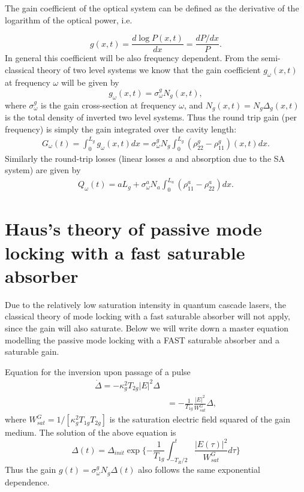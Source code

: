 \documentclass[preprint,secnumarabic,amssymb, nobibnotes, aip, prd]{revtex4-1}
\begin{document}
The gain coefficient of the optical system can be defined as the derivative of the logarithm of the optical power, i.e. 

\begin{equation}
g(x,t) = \frac{d \log P(x,t)}{dx} = \frac{dP /dx}{P}.
\end{equation}
In general this coefficient will be also frequency dependent. From the semi-classical theory of two level systems we know that the gain coefficient $g_\omega(x,t)$ at frequency $\omega$ will be given by 
\begin{equation}
g_\omega(x,t) = \sigma_{\omega}^{g}N_g(x,t), 
\end{equation} 
where $\sigma_\omega^g$ is the gain cross-section at frequency $\omega$, and $N_g(x,t) = N_g\Delta_g(x,t)$ is the total density of inverted two level systems. 
Thus the round trip gain (per frequency) is simply the gain integrated over the cavity length:
\begin{align}
\label{eq:rount_trip_gain}
G_\omega(t) = \int_{0}^{L_g} g_\omega(x,t)dx =  \sigma_{\omega}^{g} N_g \int_{0}^{L_g}(\rho_{22}^g-\rho_{11}^g)(x,t) dx.
\end{align}
Similarly the round-trip losses (linear losses $a$ and absorption due to the SA system) are given by
\begin{align}
\label{eq:rount_trip_loss}
Q_\omega(t) = aL_g +  \sigma_{\omega}^{a} N_a \int_{0}^{L_a}(\rho_{11}^a-\rho_{22}^a)dx.
\end{align}



\section{Haus's theory of passive mode locking with a fast saturable absorber}
\label{sec:haustheory}

Due to the relatively low saturation intensity in quantum cascade lasers, the classical theory of mode locking with a fast saturable absorber will not apply, since the gain will also saturate. Below we will write down a master equation modelling the passive mode locking  with a FAST saturable absorber and a saturable gain. 

Equation for the inversion upon passage of a pulse 
\begin{align}
\dot \Delta = - \kappa_g^2T_{2g} |E|^2 \Delta  \nonumber \\
&= - \frac{1}{T_{1g}}\frac{|E|^2}{W_{sat}^G}\Delta, 
\end{align}
where $W_{sat}^G = 1/[\kappa_g^2T_{1g}T_{2g}]$ is the saturation electric field squared of the gain medium. The solution of the above equation is 
\begin{equation}
\Delta(t) = \Delta_{init}\exp\{-\frac{1}{T_{1g}} \int_{-T_R/2}^{t} \frac{|E(\tau)|^2}{W_{sat}^G}d\tau\}
\end{equation}
Thus the gain $g(t) = \sigma_\omega^g N_g \Delta(t)$ also follows the same exponential dependence.  
\end{document}
